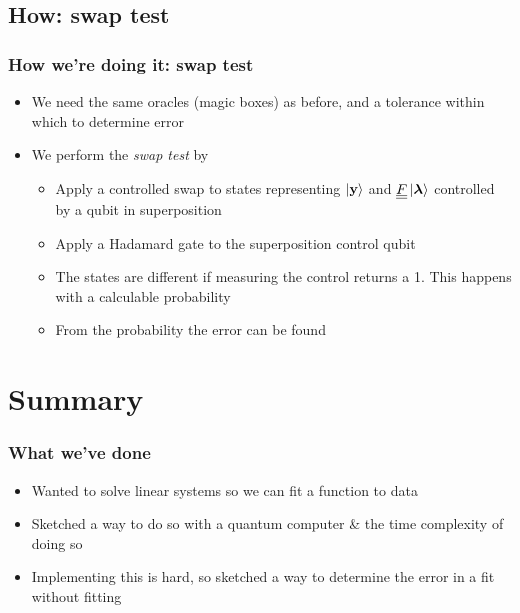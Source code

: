 \documentclass[10pt]{beamer}
\newcommand{\dul}[1]{\underline{\underline{#1}}}
\newcommand{\bv}[1]{\bm{\mathrm{#1}}}
\begin{document}
\subsection{How: swap test}
\begin{frame}
  \frametitle{How we're doing it: swap test}
  \begin{itemize}
    \item We need the same oracles (magic boxes) as before, and a tolerance within which to determine error
    \item We perform the \emph{swap test} by
          \begin{itemize}
            \item Apply a controlled swap to states representing $\ket{\bv{y}}$ and $\dul{F}\ket{\bv{\lambda}}$ controlled by a qubit in superposition
            \item Apply a Hadamard gate to the superposition control qubit
            \item The states are different if measuring the control returns a 1. This happens with a calculable probability
            \item From the probability the error can be found
          \end{itemize}
  \end{itemize}
\end{frame}

\section{Summary}
\begin{frame}
  \frametitle{What we've done}
  \begin{itemize}
    \item Wanted to solve linear systems so we can fit a function to data
    \item Sketched a way to do so with a quantum computer \& the time complexity of doing so
    \item Implementing this is hard, so sketched a way to determine the error in a fit without fitting
  \end{itemize}
\end{frame}
\end{document}
